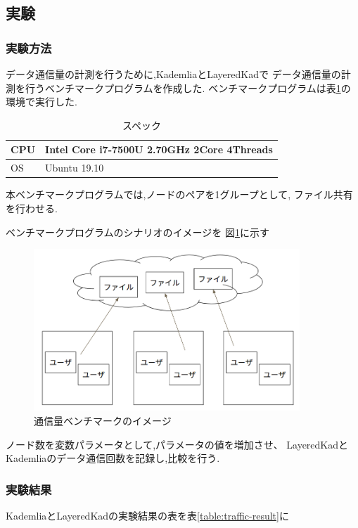\documentclass[sotsuron]{jcsie}
\begin{document}
\subsection{実験}
\subsubsection{実験方法}
データ通信量の計測を行うために,KademliaとLayeredKadで
データ通信量の計測を行うベンチマークプログラムを作成した.
ベンチマークプログラムは表\ref{table:spec-note}の環境で実行した.

\begin{table}[H]
	\caption{スペック}	
	\centering
	\label{table:spec-note}
	\begin{tabular}{|l|l|}
		\hline
		CPU &   
		Intel Core i7-7500U 2.70GHz 2Core 4Threads\\ 
		\hline	
		OS  &   
		Ubuntu 19.10 \\ 
		\hline
	\end{tabular}	
\end{table}

本ベンチマークプログラムでは,ノードのペアを1グループとして,
ファイル共有を行わせる.

ベンチマークプログラムのシナリオのイメージを
図\ref{fig:trafficBenchmark}に示す

\begin{figure}[H]
	\centering
	\includegraphics[width=10cm]{./assets/image/traffic_benchmark.png}
	\caption{通信量ベンチマークのイメージ}
	\label{fig:trafficBenchmark}
\end{figure}

ノード数を変数パラメータとして,パラメータの値を増加させ、
LayeredKadとKademliaのデータ通信回数を記録し,比較を行う.

\subsubsection{実験結果}
KademliaとLayeredKadの実験結果の表を表\ref{table:traffic-result}に
\end{document}
